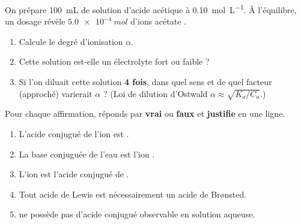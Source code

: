 \documentclass[11pt,a4paper]{article}
\begin{document}
\begin{exo}
On prépare \qty{100}{mL} de solution d'acide acétique  à \qty{0,10}{mol\per L}. À l'équilibre, un
dosage révèle $\qty{5,0e-4}{mol}$ d'ions acétate .
\begin{enumerate}[label=\alph*)]
  \item Calcule le degré d'ionisation $\alpha$.
  \item Cette solution est-elle un électrolyte fort ou faible ?
  \item Si l'on diluait cette solution \textbf{4 fois}, dans quel sens et de quel facteur (approché) varierait
        $\alpha$ ? (Loi de dilution d'Ostwald $\alpha \approx \sqrt{K_a/C_a}$.)
\end{enumerate}
\end{exo}

\begin{exo}
Pour chaque affirmation, réponds par \textbf{vrai} ou \textbf{faux} et \textbf{justifie} en une ligne.
\begin{enumerate}[label=\alph*)]
  \item L'acide conjugué de l'ion  est .
  \item La base conjuguée de l'eau  est l'ion .
  \item L'ion  est l'acide conjugué de .
  \item Tout acide de Lewis est nécessairement un acide de Brønsted.
  \item {} ne possède pas d'acide conjugué observable en solution aqueuse.
\end{enumerate}
\end{exo}
\end{document}
